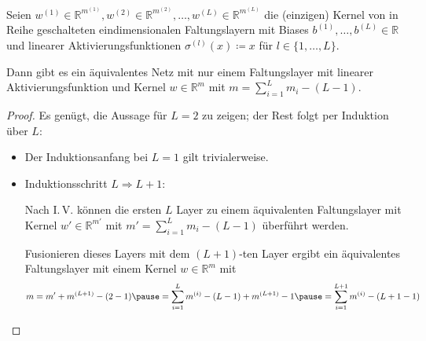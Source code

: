 \documentclass[envcountsect, smaller, aspectratio=149]{beamer}
\newcommand{\R}{\mathbb{R}}
\begin{document}

\begin{frame}
    \begin{theorem}
        Seien $w^{(1)}\in\R^{m^{(1)}}, w^{(2)}\in\R^{m^{(2)}}, \dots, w^{(L)}\in\R^{m^{(L)}}$ die (einzigen) Kernel von in Reihe geschalteten eindimensionalen Faltungslayern mit Biases $b^{(1)},\dots, b^{(L)}\in\R$ und linearer Aktivierungsfunktionen $\sigma^{(l)}(x) \coloneqq x$ für $l\in\{1,\dots,L\}$.

        Dann gibt es ein äquivalentes Netz mit nur einem Faltungslayer mit linearer Aktivierungsfunktion und Kernel $w\in\R^m$ mit $m=\sum_{i=1}^L m_i - (L-1)$.
    \end{theorem}


    \begin{proof}
        \pause Es genügt, die Aussage für $L=2$ zu zeigen; der Rest folgt per Induktion über $L$:
        \begin{itemize}
            \pause \item Der Induktionsanfang bei $L=1$ gilt trivialerweise.
            \pause \item Induktionsschritt \glqq$L\Rightarrow L+1$\grqq:
            
            Nach I.\,V. können die ersten $L$ Layer zu einem äquivalenten Faltungslayer mit Kernel $w'\in \R^{m'}$ mit $m'=\sum_{i=1}^L m_i - (L-1)$ überführt werden.

            \pause Fusionieren dieses Layers mit dem $(L+1)$-ten Layer ergibt ein äquivalentes Faltungslayer mit einem Kernel $w\in\R^m$ mit \[
                m = m' + m^{(L+1)} - (2-1) \pause = \sum_{i=1}^L m^{(i)} - (L-1) + m^{(L+1)} - 1 \pause = \sum_{i=1}^{L+1} m^{(i)} - (L+1 - 1)
                \]
        \end{itemize}
        \renewcommand{\qedsymbol}{}
    \end{proof}
\end{frame}
\end{document}
